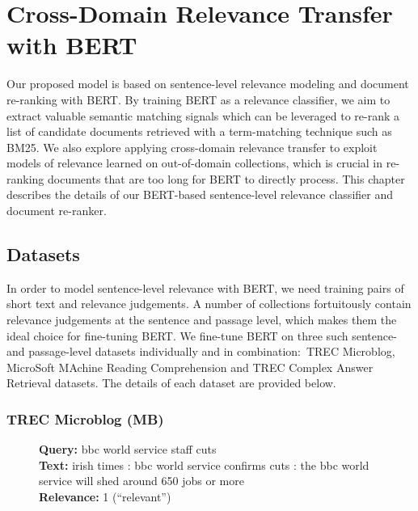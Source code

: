 \chapter{Cross-Domain Relevance Transfer with BERT}
\label{ch:model}


Our proposed model is based on sentence-level relevance modeling and document re-ranking with BERT.
By training BERT as a relevance classifier, we aim to extract valuable semantic matching signals which can be leveraged to re-rank a list of candidate documents retrieved with a term-matching technique such as BM25.
We also explore applying cross-domain relevance transfer to exploit models of relevance learned on out-of-domain collections, which is crucial in re-ranking documents that are too long for BERT to directly process.
This chapter describes the details of our BERT-based sentence-level relevance classifier and document re-ranker.

\section{Datasets}


In order to model sentence-level relevance with BERT, we need training pairs of short text and relevance judgements.
A number of collections fortuitously contain relevance judgements at the sentence and passage level, which makes them the ideal choice for fine-tuning BERT.
We fine-tune BERT on three such sentence- and passage-level datasets individually and in combination:\ TREC Microblog, MicroSoft MAchine Reading Comprehension and TREC Complex Answer Retrieval datasets.
The details of each dataset are provided below.

\subsection{TREC Microblog (MB)}

\begin{figure}[b!]
	\begin{framed}
		\centering
    		\textbf{Query:} bbc world service staff cuts \\
    		\textbf{Text:} irish times : bbc world service confirms cuts : the bbc world service will shed around 650 jobs or more \\
    		\textbf{Relevance:} 1 (``relevant'')
	\end{framed}
\label{mb-example}
 \caption{}
\end{figure}

